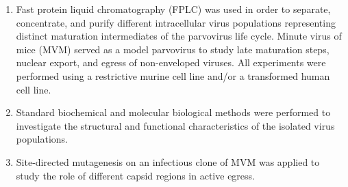 \begin{enumerate}
\item Fast protein liquid chromatography (FPLC) was used in order to separate, concentrate, and purify different intracellular virus populations representing distinct maturation intermediates of the parvovirus life cycle. Minute virus of mice (MVM) served as a model parvovirus to study late maturation steps, nuclear export, and egress of non-enveloped viruses. All experiments were performed using a restrictive murine cell line and/or a transformed human cell line.   
\item Standard biochemical and molecular biological methods were performed to investigate the structural and functional characteristics of the isolated virus populations.   
\item Site-directed mutagenesis on an infectious clone of MVM was applied to study the role of different capsid regions in active egress.
\end{enumerate}

